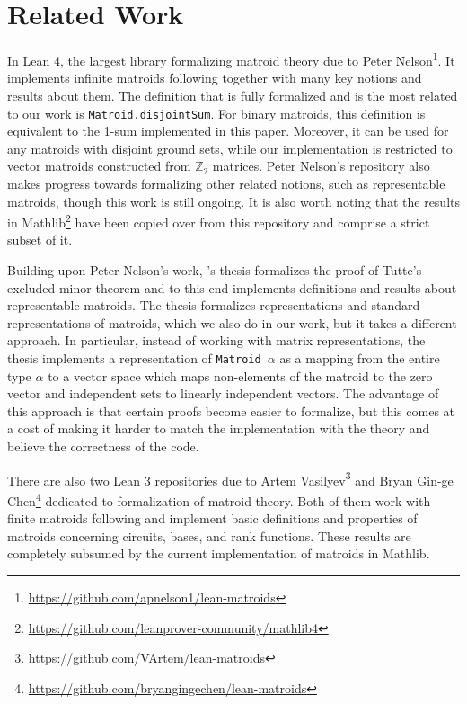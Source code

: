 \section{Related Work}

In Lean 4, the largest library formalizing matroid theory due to Peter Nelson\footnote{\url{https://github.com/apnelson1/lean-matroids}}. %
It implements infinite matroids following \cite{Bruhn2013} together with many key notions and results about them. The definition that is fully formalized and is the most related to our work is \texttt{Matroid.disjointSum}. For binary matroids, this definition is equivalent to the 1-sum implemented in this paper. Moreover, it can be used for any matroids with disjoint ground sets, while our implementation is restricted to vector matroids constructed from $\mathbb{Z}_{2}$ matrices. Peter Nelson's repository also makes progress towards formalizing other related notions, such as representable matroids, though this work is still ongoing. It is also worth noting that the results in Mathlib\footnote{\url{https://github.com/leanprover-community/mathlib4}} have been copied over from this repository and comprise a strict subset of it.

Building upon Peter Nelson's work, \citeauthor{Gusakov2024}'s thesis \cite{Gusakov2024} formalizes the proof of Tutte's excluded minor theorem and to this end implements definitions and results about representable matroids. The thesis formalizes representations and standard representations of matroids, which we also do in our work, but it takes a different approach. In particular, instead of working with matrix representations, the thesis implements a representation of \texttt{Matroid $\alpha$} as a mapping from the entire type $\alpha$ to a vector space which maps non-elements of the matroid to the zero vector and independent sets to linearly independent vectors. The advantage of this approach is that certain proofs become easier to formalize, but this comes at a cost of making it harder to match the implementation with the theory and believe the correctness of the code.

There are also two Lean 3 repositories due to Artem Vasilyev\footnote{\url{https://github.com/VArtem/lean-matroids}} and Bryan Gin-ge Chen\footnote{\url{https://github.com/bryangingechen/lean-matroids}} dedicated to formalization of matroid theory. Both of them work with finite matroids following \cite{Oxley2011} and implement basic definitions and properties of matroids concerning circuits, bases, and rank functions. These results are completely subsumed by the current implementation of matroids in Mathlib.


